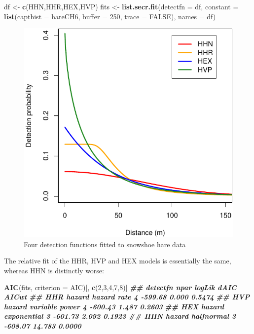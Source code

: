 \documentclass[
]{book}
\newenvironment{Shaded}{\begin{snugshade}}{\end{snugshade}}
\newcommand{\AttributeTok}[1]{\textcolor[rgb]{0.13,0.29,0.53}{#1}}
\newcommand{\ConstantTok}[1]{\textcolor[rgb]{0.56,0.35,0.01}{#1}}
\newcommand{\DecValTok}[1]{\textcolor[rgb]{0.00,0.00,0.81}{#1}}
\newcommand{\DocumentationTok}[1]{\textcolor[rgb]{0.56,0.35,0.01}{\textbf{\textit{#1}}}}
\newcommand{\FunctionTok}[1]{\textcolor[rgb]{0.13,0.29,0.53}{\textbf{#1}}}
\newcommand{\NormalTok}[1]{#1}
\newcommand{\OtherTok}[1]{\textcolor[rgb]{0.56,0.35,0.01}{#1}}
\newcommand{\StringTok}[1]{\textcolor[rgb]{0.31,0.60,0.02}{#1}}
\begin{document}
\begin{Shaded}
\begin{Highlighting}[]
\NormalTok{df }\OtherTok{\textless{}{-}} \FunctionTok{c}\NormalTok{(}\StringTok{\textquotesingle{}HHN\textquotesingle{}}\NormalTok{,}\StringTok{\textquotesingle{}HHR\textquotesingle{}}\NormalTok{,}\StringTok{\textquotesingle{}HEX\textquotesingle{}}\NormalTok{,}\StringTok{\textquotesingle{}HVP\textquotesingle{}}\NormalTok{)}
\NormalTok{fits }\OtherTok{\textless{}{-}} \FunctionTok{list.secr.fit}\NormalTok{(}\AttributeTok{detectfn =}\NormalTok{ df, }\AttributeTok{constant =} \FunctionTok{list}\NormalTok{(}\AttributeTok{capthist =}\NormalTok{ hareCH6, }
              \AttributeTok{buffer =} \DecValTok{250}\NormalTok{, }\AttributeTok{trace =} \ConstantTok{FALSE}\NormalTok{), }\AttributeTok{names =}\NormalTok{ df)}
\end{Highlighting}
\end{Shaded}

\begin{figure}
\includegraphics[width=0.6\linewidth]{SECRbook_files/figure-latex/choicedfplot-1} \caption{Four detection functions fitted to snowshoe hare data}\label{fig:choicedfplot}
\end{figure}

The relative fit of the HHR, HVP and HEX models is essentially the same, whereas HHN is distinctly worse:

\begin{Shaded}
\begin{Highlighting}[]
\FunctionTok{AIC}\NormalTok{(fits, }\AttributeTok{criterion =} \StringTok{\textquotesingle{}AIC\textquotesingle{}}\NormalTok{)[, }\FunctionTok{c}\NormalTok{(}\DecValTok{2}\NormalTok{,}\DecValTok{3}\NormalTok{,}\DecValTok{4}\NormalTok{,}\DecValTok{7}\NormalTok{,}\DecValTok{8}\NormalTok{)]}
\DocumentationTok{\#\#                  detectfn npar  logLik   dAIC  AICwt}
\DocumentationTok{\#\# HHR    hazard hazard rate    4 {-}599.68  0.000 0.5474}
\DocumentationTok{\#\# HVP hazard variable power    4 {-}600.43  1.487 0.2603}
\DocumentationTok{\#\# HEX    hazard exponential    3 {-}601.73  2.092 0.1923}
\DocumentationTok{\#\# HHN     hazard halfnormal    3 {-}608.07 14.783 0.0000}
\end{Highlighting}
\end{Shaded}
\end{document}
